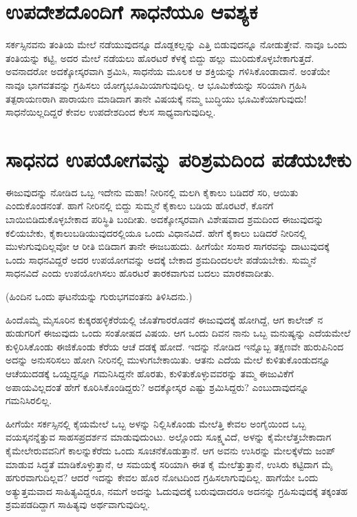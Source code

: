\section*{ಉಪದೇಶದೊಂದಿಗೆ ಸಾಧನೆಯೂ ಆವಶ್ಯಕ}

ಸರ್ಕಸ್ಸಿನವನು ತಂತಿಯ ಮೇಲೆ ನಡೆಯುವುದನ್ನೂ ದೊಡ್ದಕಲ್ಲನ್ನು ಎತ್ತಿ ಬಿಡುವುದನ್ನೂ ನೋಡುತ್ತೇವೆ. ನಾವೂ ಒಂದು ತಂತಿಯನ್ನು ಕಟ್ಟಿ, ಅದರ ಮೇಲೆ ನಡೆಯಲು ಹೊರಟರೆ ಕೆಳಕ್ಕೆ ಬಿದ್ದು ಹಲ್ಲು ಮುರಿದುಕೊಳ್ಳಬೇಕಾಗುತ್ತದೆ. ಅವನಾದರೋ ಅದಕ್ಕೋಸ್ಕರವಾಗಿ ಶ್ರಮಿಸಿ, ಸಾಧನೆಯ ಮೂಲಕ ಆ ಶಕ್ತಿಯನ್ನು ಗಳಿಸಿಕೊಂಡಾದಾನೆ. ಅಂತೆಯೇ ನಾವೂ ಭಾಗವತವನ್ನು ಗ್ರಹಿಸಲು ಯೋಗ್ಯಭೂಮಿಯಾಗುವುದಿಲ್ಲ. ಆ ಭೂಮಿಕೆಯನ್ನು ಸರಿಯಾಗಿ ಗ್ರಹಿಸಿ ತತ್ಪರಾಯಣರಾಗಿ ಪಾರಾಯಣ ಮಾಡಿದಾಗ ತಾನೇ ವಿಷಯಕ್ಕೆ ನಮ್ಮ ಬುದ್ಧಿಯು ಭೂಮಿಕೆಯಾಗುವುದು! ಸಾಧನೆಯಿಲ್ಲದಿದ್ದರೆ ಕೇವಲ ಉಪದೇಶದಿಂದ ಕೆಲಸ ಸಾಧ್ಯವಾಗುವುದಿಲ್ಲ.

\section*{ಸಾಧನದ ಉಪಯೋಗವನ್ನು ಪರಿಶ್ರಮದಿಂದ ಪಡೆಯಬೇಕು}

ಈಜುವುದನ್ನು ನೋಡಿದ ಒಬ್ಬ ಇದೇನು ಮಹಾ! ನೀರಿನಲ್ಲಿ ಮಲಗಿ ಕೈಕಾಲು ಬಡಿದರೆ ಸರಿ, ಆಯಿತು ಎಂದುಕೊಂಡನಂತೆ. ಹಾಗೆ ನೀರಿನಲ್ಲಿ ಬಿದ್ದು ಸುಮ್ಮನೆ ಕೈಕಾಲು ಬಡಿಯ ಹೊರಟರೆ, ಕೊನಗೆ ಬಾಯಿಬಿಡಿದುಕೊಳ್ಳಬೇಕಾದ ಪರಿಸ್ಥಿತಿ ಬಂದೀತು. ಅದಕ್ಕೋಸ್ಕರವಾಗಿ ವಿಶೇಷವಾದ ಶ್ರಮದಿಂದ ಈಜುವುದನ್ನು ಕಲಿಯಬೇಕು, ಕೈಕಾಲುಬಡಿಯುವುದರಲ್ಲಿಯೂ ಒಂದು ವಿಧಾನವಿದೆ. ಹೇಗೆ ಕೈಕಾಲು ಬಡಿದರೆ ನೀರಿನಲ್ಲಿ ಮುಳುಗುವುದಿಲ್ಲವೋ ಆ ರೀತಿ ಬಿಡಿದಾಗ ತಾನೇ ಈಜಬಹುದು. ಹೀಗೆಯೇ ಸಂಸಾರ ಸಾಗರವನ್ನು ದಾಟುವುದಕ್ಕೆ ಒಂದು ಸಾಧನವಿದ್ದರೆ ಅದರ ಉಪಯೋಗವನ್ನು ಅದಕ್ಕೆ ಬೇಕಾದ ಶ್ರಮದಿಂದಲಲೇ ಪಡೆಯಬೇಕು. ಸುಮ್ಮನೆ ಸಾಧನವಿದೆ ಎಂದು ಉಪಯೋಗಿಸಲು ಹೊರಟರೆ ತಾರಕವಾಗುವ ಬದಲು ಮಾರಕವಾದೀತು.

(ಹಿಂದಿನ ಒಂದು ಘಟನೆಯನ್ನು ಗುರುಭಗವಂತನು ತಿಳಿಸಿದನು.)

ಹಿಂದೊಮ್ಮೆ ಮೈಸೂರಿನ ಕುಕ್ಕರಹಳ್ಳಿಕೆರೆಯಲ್ಲಿ ಜೊತೆಗಾರರೊಡನೆ ಈಜುವುದಕ್ಕೆ ಹೋಗಿದ್ದೆ, ಆಗ ಕಾಲೇಜ್ ನ ಹುಡುಗರಿಗೆ ಈಜುವುದು ಒಂದು ಸಂತೋಷದ ವಿಷಯ. ಆಗ ಒಂದು ದಿವನ ನಾನು ಒಬ್ಬ ಮನುಷ್ಯನ್ನು ಎದೆಯಮೇಲೆ ಕುಳ್ಳಿರಿಸಿಕೊಂಡು ಈಜಿಕೊಂಡು ಕೆರೆಯ ಆಚೆ ದಡಕ್ಕೆ ಹೋದೆ. ಇದನ್ನು ನೋಡಿದ ಇನ್ನೊಬ್ಬ ತಕ್ಷಣವೇ ಹುರುಪಿನಿಂದ ಅದನ್ನು ಅನುಸರಿಸಲು ಹೋಗಿ ನೀರಿನಲ್ಲಿ ಮುಳುಗಬೇಕಾಯಿತು. ಆತನು ಎದೆಯ ಮೇಲೆ ಕುಳಿತುಕೊಂಡುದನ್ನೂ ಆಚೆಯುದಡಕ್ಕೆ ಒಯ್ದದ್ದನ್ನೂ ಗಮನಿಸಿದ್ದನೇ ಹೊರತು, ಕುಳಿತುಕೊಳ್ಳುವವರನ್ನು ತಮ್ಮ ಈಜುವಿಕೆಗೆ ಅಪಾಯವಿಲ್ಲದಂತೆ ಹೇಗೆ ಕೂರಿಸಿಕೊಂಡಿದ್ದರು? ಅದಕ್ಕೋಸ್ಕರ ಎಷ್ಟು ಶ್ರಮಿಸಿದ್ದರು? ಎಂಬುದಾವುದನ್ನೂ ಗಮನಿಸಿರಲಿಲ್ಲ. 

ಹೀಗೆಯೇ ಸರ್ಕಸ್ಸಿನಲ್ಲಿ ಕೈಯಮೇಲೆ ಒಬ್ಬ ಅಳನ್ನು ನಿಲ್ಲಿಸಿಕೊಂಡು ಮೇಲೆತ್ತಿ ಕೇವಲ ಅಂಗೈಯಿಂದ ಒಬ್ಬ ವಯಸ್ಕನನ್ನೆತ್ತುವ ಸಾಹಸಪ್ರದರ್ಶನ ಮಾಡುವುದುಂಟು. ಅಲ್ಲೊಂದು ಸೂಕ್ಷ್ಮವಿದೆ, ಅಳನ್ನು ಕೈಮೇಲೆತ್ತಬೇಕಾದಾಗ ಕೈಮೇಲೇರುವವನಿಗೆ ಕಾಲನ್ನುಕೆರೆದು ಒಂದು ಸೂಚನೆಕೊಡುತ್ತಾನೆ. ಆಗ ಅವನು ಉಸಿರನ್ನು ಮೇಲಕ್ಕೆಳೆದು ಜಂಪ್ ಮಾಡುವ ಸಿದ್ಧತೆ ಮಾಡಿಕೊಳ್ಳುತ್ತಾನೆ, ಆ ಸಮಯಕ್ಕೆ ಸರಿಯಾಗಿ ಈತ ಕೈ ಮೇಲೆತ್ತುತ್ತಾನೆ, ಉಸಿರು ಕಟ್ಟಿದಾಗ ಮೈ ಹಗುರವಾಗುದಿಲ್ಲವ? ಆದರೆ ಇದನ್ನು ಕೇವಲ ಹೊರ ನೋಟದಿಂದ ಗ್ರಹಿಸಲಾಗುವುದಿಲ್ಲ. ಹಾಗೆಯೇ ಒಂದು ಅತ್ಯುತ್ತಮವಾದ ಸಾಹಿತ್ಯವಿದ್ದರೂ, ನಮಗೆ ಅದನ್ನು ಓದುವುದಕ್ಕೆ ಬರುವುದಾದರೂ ಅದನನ್ನು ಗ್ರಹಿಸುವುದಕ್ಕೆ ತಕ್ಕಂತಹ ಶ್ರಮಪಡದಿದ್ದಾಗ ಸಾಹಿತ್ಯವು ಅರ್ಥವಾಗುವುದಿಲ್ಲ. 

